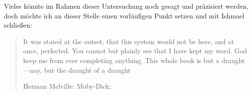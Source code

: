 
Vieles könnte im Rahmen dieser Untersuchung noch gesagt und präzisiert werden,
doch möchte ich an dieser Stelle einen vorläufigen Punkt setzen und mit Ishmael
schließen: \foreignblockquote{english}[{Herman Melville: Moby-Dick;
\cite[159]{melville:mobydick}}]{It was stated at the outset, that this system
would not be here, and at once, perfected. You cannot but plainly see that I
have kept my word.
\textelp{}
God keep me from ever completing anything. This whole book is but a
draught---nay, but the draught of a draught}. %
